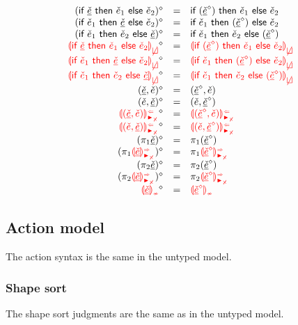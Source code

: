 \documentclass[formalism.tex]{subfiles}
\begin{document}
\[\begin{array}{rcl}
  \cursorErasesToRow{(\ZCIfC{\ZCMV}{\ECMV_1}{\ECMV_2})}{\ECIf{(\cursorErase{\ZCMV})}{\ECMV_1}{\ECMV_2}} \\
  \cursorErasesToRow{(\ZCIfL{\ECMV_1}{\ZCMV}{\ECMV_2})}{\ECIf{\ECMV_1}{(\cursorErase{\ZCMV})}{\ECMV_2}} \\
  \cursorErasesToRow{(\ZCIfL{\ECMV_1}{\ECMV_2}{\ZCMV})}{\ECIf{\ECMV_1}{\ECMV_2}{(\cursorErase{\ZCMV})}} \\
  \cursorErasesToRow{\ZCInconBrC{\ZCMV}{\ECMV_1}{\ECMV_2}}{\ECInconBr{(\cursorErase{\ZCMV})}{\ECMV_1}{\ECMV_2}} \\
  \cursorErasesToRow{\ZCInconBrL{\ECMV_1}{\ZCMV}{\ECMV_2}}{\ECInconBr{\ECMV_1}{(\cursorErase{\ZCMV})}{\ECMV_2}} \\
  \cursorErasesToRow{\ZCInconBrR{\ECMV_1}{\ECMV_2}{\ZCMV}}{\ECInconBr{\ECMV_1}{\ECMV_2}{(\cursorErase{\ZCMV})}} \\
  \cursorErasesToRow{\ZCPairL{\ZCMV}{\ECMV}}{\ECPair{\cursorErase{\ZCMV}}{\ECMV}} \\
  \cursorErasesToRow{\ZCPairR{\ECMV}{\ZCMV}}{\ECPair{\ECMV}{\cursorErase{\ZCMV}}} \\
  \cursorErasesToRow{\ZCPairAnaNonMatchedProdL{\ZCMV}{\ECMV}}{\ECPairAnaNonMatchedProd{\cursorErase{\ZCMV}}{\ECMV}} \\
  \cursorErasesToRow{\ZCPairAnaNonMatchedProdR{\ECMV}{\ZCMV}}{\ECPairAnaNonMatchedProd{\ECMV}{\cursorErase{\ZCMV}}} \\
  \cursorErasesToRow{(\ZCProjL{\ZCMV})}{\ECProjL{(\cursorErase{\ZCMV})}} \\
  \cursorErasesToRow{(\ZCProjLSynNonMatchedProd{\ZCMV})}{\ECProjLSynNonMatchedProd{\cursorErase{\ZCMV}}} \\
  \cursorErasesToRow{(\ZCProjR{\ZCMV})}{\ECProjR{(\cursorErase{\ZCMV})}} \\
  \cursorErasesToRow{(\ZCProjRSynNonMatchedProd{\ZCMV})}{\ECProjRSynNonMatchedProd{\cursorErase{\ZCMV}}} \\
  \cursorErasesToRow{\ZCInconType{\ZCMV}}{\ECInconType{\cursorErase{\ZCMV}}} \\
\end{array}\]

\subsection{Action model}
\label{sec:typed-action-model}
The action syntax is the same in the untyped model.

\subsubsection{Shape sort}
\label{sec:typed-shape-sort}
The shape sort judgments are the same as in the untyped model.
\end{document}
